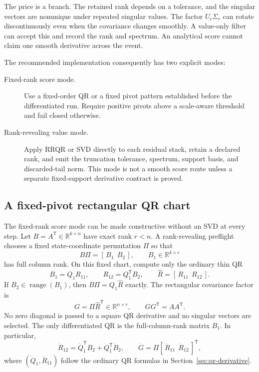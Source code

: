 \documentclass[11pt]{article}
\newcommand{\R}{\mathbb{R}}
\newcommand{\range}{\operatorname{range}}
\newcommand{\transpose}{^{\mathsf T}}
\begin{document}
The price is a branch.  The retained rank depends on a tolerance, and the
singular vectors are nonunique under repeated singular values.  The factor
$U_r\Sigma_r$ can rotate discontinuously even when the covariance changes
smoothly.  A value-only filter can accept this and record the rank and spectrum.
An analytical score cannot claim one smooth derivative across the event.

The recommended implementation consequently has two explicit modes:
\begin{description}
  \item[Fixed-rank score mode.] Use a fixed-order QR or a fixed pivot pattern
    established before the differentiated run.  Require positive pivots above
    a scale-aware threshold and fail closed otherwise.
  \item[Rank-revealing value mode.] Apply RRQR or SVD directly to each residual
    stack, retain a declared rank, and emit the truncation tolerance, spectrum,
    support basis, and discarded-tail norm.  This mode is not a smooth score
    route unless a separate fixed-support derivative contract is proved.
\end{description}

\subsection{A fixed-pivot rectangular QR chart}

The fixed-rank score mode can be made constructive without an SVD at every
step.  Let $B=A\transpose\in\R^{k\times n}$ have exact rank $r<n$.  A
rank-revealing preflight chooses a fixed state-coordinate permutation $\Pi$ so
that
\begin{equation}
 B\Pi=[\,B_1\ \ B_2\,],\qquad B_1\in\R^{k\times r}
 \label{eq:pivot-partition}
\end{equation}
has full column rank.  On this fixed chart, compute only the ordinary thin QR
\begin{equation}
 B_1=Q_1R_{11},\qquad R_{12}=Q_1\transpose B_2,
 \qquad \widehat R=[\,R_{11}\ \ R_{12}\,].
 \label{eq:rectangular-qr-chart}
\end{equation}
If $B_2\in\range(B_1)$, then $B\Pi=Q_1\widehat R$ exactly.  The rectangular
covariance factor is
\begin{equation}
 G=\Pi\widehat R\transpose\in\R^{n\times r},
 \qquad GG\transpose=A A\transpose.
 \label{eq:rectangular-qr-factor}
\end{equation}
No zero diagonal is passed to a square QR derivative and no singular vectors
are selected.  The only differentiated QR is the full-column-rank matrix
$B_1$.  In particular,
\begin{equation}
 \dot R_{12}=\dot Q_1\transpose B_2+Q_1\transpose\dot B_2,
 \qquad
 \dot G=\Pi[\,\dot R_{11}\ \ \dot R_{12}\,]\transpose,
 \label{eq:rectangular-qr-derivative}
\end{equation}
where $(\dot Q_1,\dot R_{11})$ follow the ordinary QR formulas in
Section~\ref{sec:qr-derivative}.
\end{document}

